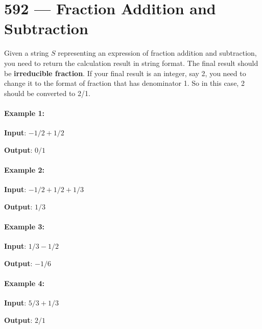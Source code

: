 \section{592 --- Fraction Addition and Subtraction}
Given a string $S$ representing an expression of fraction addition and subtraction, you need to return the calculation result in string format. The final result should be \textbf{irreducible fraction}. If your final result is an integer, say 2, you need to change it to the format of fraction that has denominator 1. So in this case, 2 should be converted to 2/1.

\paragraph{Example 1:}

\begin{flushleft}

\textbf{Input}: $ -1/2+1/2 $

\textbf{Output}: $ 0/1 $

\end{flushleft}

\paragraph{Example 2:}

\begin{flushleft}
\textbf{Input}: $ -1/2+1/2+1/3 $

\textbf{Output}: $ 1/3 $
\end{flushleft}

\paragraph{Example 3:}

\begin{flushleft}
\textbf{Input}: $ 1/3-1/2 $

\textbf{Output}: $ -1/6 $
\end{flushleft}

\paragraph{Example 4:}

\begin{flushleft}
\textbf{Input}: $ 5/3+1/3 $

\textbf{Output}: $ 2/1 $
\end{flushleft}

